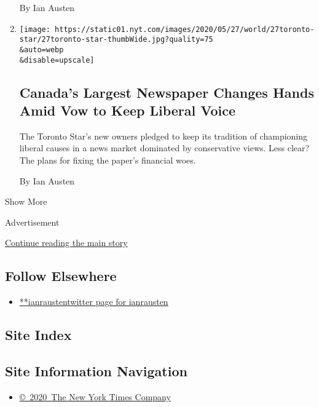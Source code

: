\begin{enumerate}
  By Ian Austen
\item
  \href{/2020/05/27/world/canada/Toronto-star-sold.html}{}

  \texttt{[image: https://static01.nyt.com/images/2020/05/27/world/27toronto-star/27toronto-star-thumbWide.jpg?quality=75\\\&auto=webp\\\&disable=upscale]}

  \hypertarget{canadas-largest-newspaper-changes-hands-amid-vow-to-keep-liberal-voice}{%
  \subsection{Canada's Largest Newspaper Changes Hands Amid Vow to Keep
  Liberal
  Voice}\label{canadas-largest-newspaper-changes-hands-amid-vow-to-keep-liberal-voice}}

  The Toronto Star's new owners pledged to keep its tradition of
  championing liberal causes in a news market dominated by conservative
  views. Less clear? The plans for fixing the paper's financial woes.

  By Ian Austen
\end{enumerate}

Show More

Advertisement

\protect\hyperlink{after-mid2}{Continue reading the main story}

\hypertarget{follow-elsewhere}{%
\subsection{Follow Elsewhere}\label{follow-elsewhere}}

\begin{itemize}
\tightlist
\item
  \href{https://twitter.com/ianrausten}{**ianraustentwitter page for
  ianrausten}
\end{itemize}

\hypertarget{site-index}{%
\subsection{Site Index}\label{site-index}}

\hypertarget{site-information-navigation}{%
\subsection{Site Information
Navigation}\label{site-information-navigation}}

\begin{itemize}
\tightlist
\item
  \href{https://help.nytimes.com/hc/en-us/articles/115014792127-Copyright-notice}{©~2020~The
  New York Times Company}
\end{itemize}

